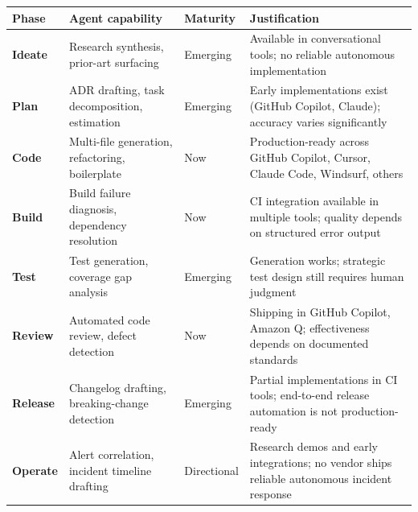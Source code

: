 \documentclass[
  a4paper,
  DIV=11,
  numbers=noendperiod]{scrreprt}
\newcounter{none} %
\begin{document}
{\def\LTcaptype{none} %
\begin{longtable}[]{@{}
  >{\raggedright\arraybackslash}p{}
  >{\raggedright\arraybackslash}p{}
  >{\raggedright\arraybackslash}p{}
  >{\raggedright\arraybackslash}p{}@{}}
\toprule\noalign{}
\begin{minipage}[b]{\linewidth}\raggedright
Phase
\end{minipage} & \begin{minipage}[b]{\linewidth}\raggedright
Agent capability
\end{minipage} & \begin{minipage}[b]{\linewidth}\raggedright
Maturity
\end{minipage} & \begin{minipage}[b]{\linewidth}\raggedright
Justification
\end{minipage} \\
\midrule\noalign{}
\endhead
\bottomrule\noalign{}
\endlastfoot
\textbf{Ideate} & Research synthesis, prior-art surfacing & Emerging &
Available in conversational tools; no reliable autonomous
implementation \\
\textbf{Plan} & ADR drafting, task decomposition, estimation & Emerging
& Early implementations exist (GitHub Copilot, Claude); accuracy varies
significantly \\
\textbf{Code} & Multi-file generation, refactoring, boilerplate & Now &
Production-ready across GitHub Copilot, Cursor, Claude Code, Windsurf,
others \\
\textbf{Build} & Build failure diagnosis, dependency resolution & Now &
CI integration available in multiple tools; quality depends on
structured error output \\
\textbf{Test} & Test generation, coverage gap analysis & Emerging &
Generation works; strategic test design still requires human judgment \\
\textbf{Review} & Automated code review, defect detection & Now &
Shipping in GitHub Copilot, Amazon Q; effectiveness depends on
documented standards \\
\textbf{Release} & Changelog drafting, breaking-change detection &
Emerging & Partial implementations in CI tools; end-to-end release
automation is not production-ready \\
\textbf{Operate} & Alert correlation, incident timeline drafting &
Directional & Research demos and early integrations; no vendor ships
reliable autonomous incident response \\
\end{longtable}
}
\end{document}
